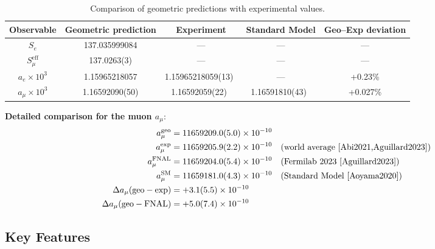 \documentclass[aps,prd,reprint,nofootinbib]{revtex4-2}
\begin{document}
\begin{table}[t]
\caption{Comparison of geometric predictions with experimental values.}
\label{tab:results}
\begin{ruledtabular}
\begin{tabular}{c c c c c}
\hline
Observable & Geometric prediction & Experiment & Standard Model & Geo--Exp deviation \\
\hline
$S_e$ & 137.035999084 & --- & --- & --- \\
$S_\mu^{\text{eff}}$ & 137.0263(3) & --- & --- & --- \\
$a_e \times 10^3$ & 1.15965218057 & 1.15965218059(13)~\cite{Hanneke2008,Fan2023} & --- & +0.23\% \\
$a_\mu \times 10^3$ & 1.16592090(50) & 1.16592059(22)~\cite{Abi2021,Aguillard2023} & 1.16591810(43)~\cite{Aoyama2020} & +0.027\% \\
\hline
\end{tabular}
\end{ruledtabular}
\end{table}

\textbf{Detailed comparison for the muon $a_\mu$}:
\begin{align}
a_\mu^{\text{geo}} &= 11659209.0(5.0) \times 10^{-10} \\
a_\mu^{\text{exp}} &= 11659205.9(2.2) \times 10^{-10} \quad \text{(world average~\cite{Abi2021,Aguillard2023})} \\
a_\mu^{\text{FNAL}} &= 11659204.0(5.4) \times 10^{-10} \quad \text{(Fermilab 2023~\cite{Aguillard2023})} \\
a_\mu^{\text{SM}} &= 11659181.0(4.3) \times 10^{-10} \quad \text{(Standard Model~\cite{Aoyama2020})} \\
\Delta a_\mu(\text{geo}-\text{exp}) &= +3.1(5.5) \times 10^{-10} \\
\Delta a_\mu(\text{geo}-\text{FNAL}) &= +5.0(7.4) \times 10^{-10}
\end{align}

\subsection{Key Features}
\end{document}
